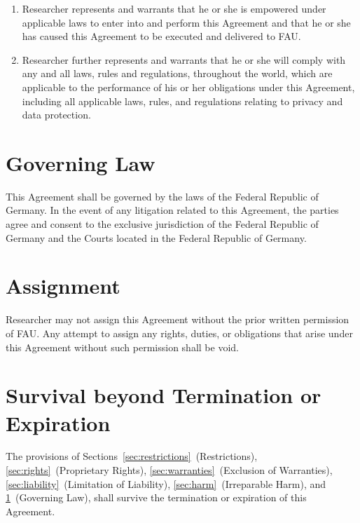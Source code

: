 \documentclass[11pt]{article}
\begin{document}
\begin{Form}
  \begin{enumerate}[label=\alph*)]
    \item Researcher represents and warrants that he or she is empowered under applicable laws to enter into and perform this Agreement and that he or she has caused this Agreement to be executed and delivered to FAU.
    \item Researcher further represents and warrants that he or she will comply with any and all laws, rules and regulations, throughout the world, which are applicable to the performance of his or her obligations under this Agreement, including all applicable laws, rules, and regulations relating to privacy and data protection.
  \end{enumerate}

  
  \section{Governing Law}
  \label{sec:law}

  This Agreement shall be governed by the laws of the Federal Republic of Germany.
  In the event of any litigation related to this Agreement, the parties agree and consent to the exclusive jurisdiction of the Federal Republic of Germany   and the Courts located in the Federal Republic of Germany.



  \section{Assignment}
  \label{sec:assignment}

  Researcher may not assign this Agreement without the prior written permission of FAU.
  Any attempt to assign any rights, duties, or obligations that arise under this Agreement without such permission shall be void.


  \section{Survival beyond Termination or Expiration}
  \label{sec:survival}

  The provisions of Sections~\ref{sec:restrictions}~(Restrictions), \ref{sec:rights}~(Proprietary Rights), \ref{sec:warranties}~(Exclusion of Warranties), \ref{sec:liability}~(Limitation of Liability), \ref{sec:harm}~(Irreparable Harm), and \ref{sec:law}~(Governing Law), shall survive the termination or expiration of this Agreement.


\end{Form}
\end{document}
